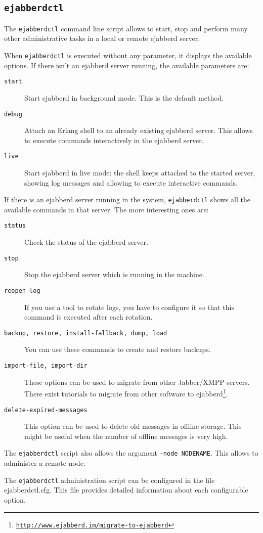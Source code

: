\documentclass[a4paper,10pt]{book}
\newcommand{\ind}[1]{\begin{latexonly}\index{#1}\end{latexonly}}
\newcommand{\bracehack}{\def\{{\char"7B}\def\}{\char"7D}}
\newcommand{\titem}[1]{\item[\bracehack\texttt{#1}]}
\newcommand{\term}[1]{\texttt{#1}}
\newcommand{\Jabber}{Jabber}
\gdef\footahref#1#2{#2\footnote{\href{#1}{\texttt{#1}}}}
\begin{document}
\subsection{\term{ejabberdctl}}
\label{ejabberdctl}

The \term{ejabberdctl} command line script allows to start, stop and perform 
many other administrative tasks in a local or remote ejabberd server.

When \term{ejabberdctl} is executed without any parameter,
it displays the available options. If there isn't an ejabberd server running, 
the available parameters are:
\begin{description}
\titem{start} Start ejabberd in background mode. This is the default method.
\titem{debug} Attach an Erlang shell to an already existing ejabberd server. This allows to execute commands interactively in the ejabberd server.
\titem{live} Start ejabberd in live mode: the shell keeps attached to the started server, showing log messages and allowing to execute interactive commands.
\end{description}

If there is an ejabberd server running in the system,
\term{ejabberdctl} shows all the available commands in that server.
The more interesting ones are:
\begin{description}
\titem{status} Check the status of the ejabberd server.
\titem{stop} Stop the ejabberd server which is running in the machine.
\titem{reopen-log} If you use a tool to rotate logs, you have to configure it
  so that this command is executed after each rotation.
\titem {backup, restore, install-fallback, dump, load} You can use these
  commands to create and restore backups. 
\titem{import-file, import-dir} \ind{migration from other software}
  These options can be used to migrate from other \Jabber{}/XMPP servers. There
  exist tutorials to \footahref{http://www.ejabberd.im/migrate-to-ejabberd}{migrate from other software to ejabberd}.
\titem{delete-expired-messages} This option can be used to delete old messages
  in offline storage. This might be useful when the number of offline messages
  is very high.
\end{description}

The \term{ejabberdctl} script also allows the argument \term{--node NODENAME}.
This allows to administer a remote node.

The \term{ejabberdctl} administration script can be configured in the file ejabberdctl.cfg.
This file provides detailed information about each configurable option.
\end{document}
